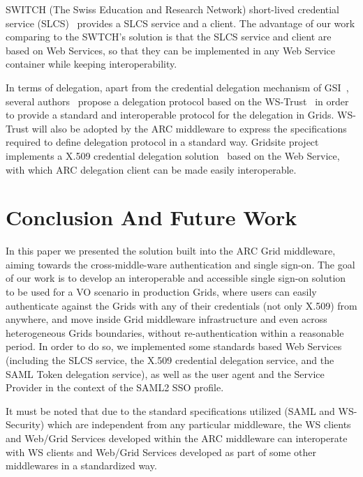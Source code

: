 \documentclass[conference]{IEEEtran}
\begin{document}
SWITCH (The Swiss Education and Research Network) short-lived credential service (SLCS)~\cite{switchslcslink} provides a SLCS service and a client. The advantage of our work comparing to the SWTCH's solution is that the SLCS service and client are based on Web Services, so that they can be implemented in any Web Service container while keeping interoperability.

In terms of delegation, apart from the credential delegation mechanism of GSI~\cite{IFoster98,VWelch04}, several authors~\cite{MAhsant04} propose a delegation protocol based on the WS-Trust~\cite{WSTrustlink} in order to provide a standard and interoperable protocol for the delegation in Grids. WS-Trust will also be adopted by the ARC middleware to express the specifications required to define delegation protocol in a standard way. Gridsite project implements a X.509 credential delegation solution~\cite{GridSitelink} based on the Web Service, with which ARC delegation client can be made easily interoperable.

\section{Conclusion And Future Work}
\label{sec:conclusion}
In this paper we presented the solution built into the ARC Grid middleware, aiming towards the cross-middle-ware authentication and single sign-on. The goal of our work is to develop an interoperable and accessible single sign-on solution to be used for a VO scenario in production Grids, where users can easily authenticate against the Grids with any of their credentials (not only X.509) from anywhere, and move inside Grid middleware infrastructure and even across heterogeneous Grids  boundaries, without re-authentication within a reasonable period. In order to do so, we implemented some standards based Web Services (including the SLCS service, the X.509 credential delegation service, and the SAML Token delegation service), as well as the user agent and the Service Provider in the context of the SAML2 SSO profile.

It must be noted that due to the standard specifications utilized (SAML and WS-Security) which are independent from any particular middleware, the WS clients and Web/Grid Services developed within the ARC middleware can interoperate with WS clients and Web/Grid Services developed as part of some other middlewares in a standardized way.
\end{document}
